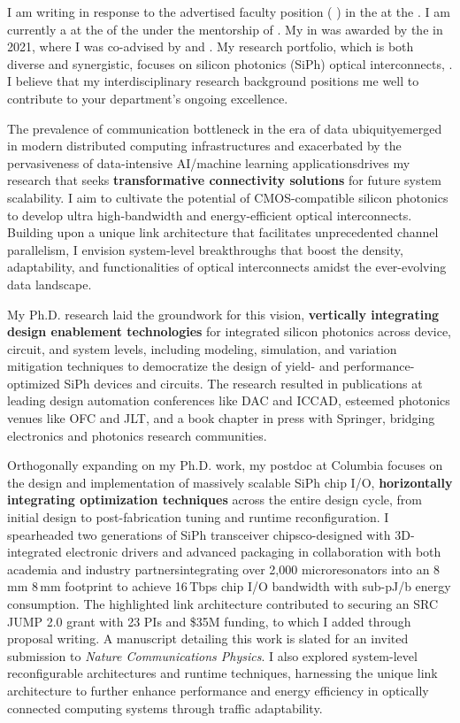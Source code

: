 I am writing in response to the advertised faculty position (\textbf{\appPosition{} \appJobID}) in the \appDept{} at the \appSchool{}. I am currently a \myTitle{} at the \myDept{} of the \mySchoolShort{} under the mentorship of \mySuper{}. My \myDegree{} in \myMajor{} was awarded by the \myPhDSchool{} in 2021, where I was co-advised by \myAdvisor{} and \myCoAdvisor{}. My research portfolio, which is both diverse and synergistic, focuses on silicon photonics (SiPh) optical interconnects, \appSpecific{}. I believe that my interdisciplinary research background positions me well to contribute to your department's ongoing excellence.

The prevalence of communication bottleneck in the era of data ubiquity\textemdash emerged in modern distributed computing infrastructures and exacerbated by the pervasiveness of data-intensive AI/machine learning applications\textemdash drives my research that seeks \textbf{transformative connectivity solutions} for future system scalability. I aim to cultivate the potential of CMOS-compatible silicon photonics to develop ultra high-bandwidth and energy-efficient optical interconnects. Building upon a unique link architecture that facilitates unprecedented channel parallelism, I envision system-level breakthroughs that boost the density, adaptability, and functionalities of optical interconnects amidst the ever-evolving data landscape.

My Ph.D. research laid the groundwork for this vision, \textbf{vertically integrating design enablement technologies} for integrated silicon photonics across device, circuit, and system levels, including modeling, simulation, and variation mitigation techniques to democratize the design of yield- and performance-optimized SiPh devices and circuits. The research resulted in publications at leading design automation conferences like DAC and ICCAD, esteemed photonics venues like OFC and JLT, and a book chapter in press with Springer, bridging electronics and photonics research communities.

Orthogonally expanding on my Ph.D. work, my postdoc at Columbia focuses on the design and implementation of massively scalable SiPh chip I/O, \textbf{horizontally integrating optimization techniques} across the entire design cycle, from initial design to post-fabrication tuning and runtime reconfiguration. I spearheaded two generations of SiPh transceiver chips\textemdash co-designed with 3D-integrated electronic drivers and advanced packaging in collaboration with both academia and industry partners\textemdash integrating over 2,000 microresonators into an 8\,mm \texttimes{} 8\,mm footprint to achieve 16\,Tbps chip I/O bandwidth with sub-pJ/b energy consumption. The highlighted link architecture contributed to securing an SRC JUMP 2.0 grant with 23 PIs and \$35M funding, to which I added through proposal writing. A manuscript detailing this work is slated for an invited submission to \emph{Nature Communications Physics}. I also explored system-level reconfigurable architectures and runtime techniques, harnessing the unique link architecture to further enhance performance and energy efficiency in optically connected computing systems through traffic adaptability.

